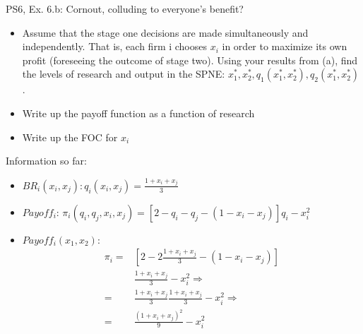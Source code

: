 \begin{frame}{PS6, Ex. 6.b: Cornout, colluding to everyone's benefit?}
    \begin{itemize}
    \item[(b)] Assume that the stage one decisions are made simultaneously and independently. That is, each firm i chooses $x_i$ in order to maximize its own profit (foreseeing the outcome of stage two). Using your results from (a), find the levels of research and output in the SPNE: $x_1^*,x_2^*,q_1(x_1^*,x_2^*),q_2(x_1^*,x_2^*)$.
    \end{itemize}
    \vfill\null
  \begin{multicols}{2}
    \begin{itemize}
      \item[(Step 1)] Write up the payoff function as a function of research
      \item[(Step 2)] Write up the FOC for $x_i$
    \end{itemize}
    \vfill\null \columnbreak
    Information so far:
    \begin{itemize}
    \item[1] $BR_i(x_i,x_j): q_i(x_i,x_j)=\frac{1+x_i+x_j}{3}$
    \item[2] $Payoff_i$: $\pi_i(q_i,q_j,x_i,x_j) = [2-q_i-q_j-(1-x_i-x_j)]q_i-x_i^2$
    \item[3] $Payoff_i(x_1,x_2)$:
             \begin{align*}
               \pi_i =& [2-2\frac{1+x_i+x_j}{3}-(1-x_i-x_j)]\\
                      &\frac{1+x_i+x_j}{3}-x_i^2\Rightarrow\\
                              =& \frac{1+x_i+x_j}{3}\frac{1+x_i+x_j}{3}-x_i^2\Rightarrow\\
                              =& \frac{(1+x_i+x_j)^2}{9}-x_i^2
             \end{align*}
    \end{itemize}
    \vfill\null
  \end{multicols}
\end{frame}

